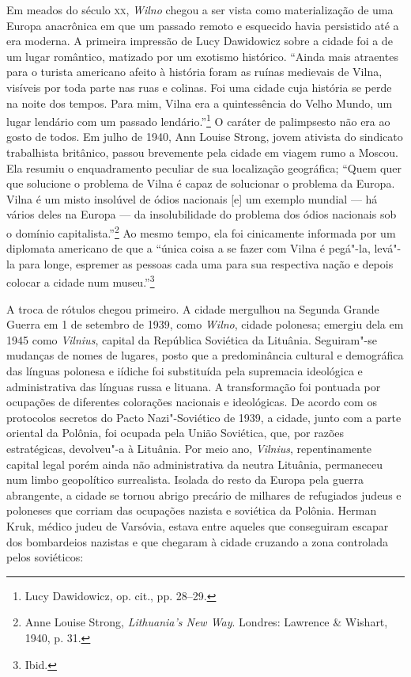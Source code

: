 %

Em meados do século \textsc{xx}, \textit{Wilno} chegou a ser vista como materialização de
uma Europa anacrônica em que um passado remoto e esquecido havia
persistido até a era moderna. A primeira impressão de Lucy Dawidowicz
sobre a cidade foi a de um lugar romântico, matizado por um exotismo
histórico. ``Ainda mais atraentes para o turista americano afeito à
história foram as ruínas medievais de Vilna, visíveis por toda parte nas
ruas e colinas. Foi uma cidade cuja história se perde na noite dos
tempos. Para mim, Vilna era a quintessência do Velho Mundo, um lugar
lendário com um passado lendário.''\footnote{Lucy Dawidowicz, op. cit., pp. 28--29.} O caráter de palimpsesto não era ao gosto de todos. Em julho de 1940, Ann Louise Strong, jovem ativista do sindicato
trabalhista britânico, passou brevemente pela cidade em viagem rumo a
Moscou. Ela resumiu o enquadramento peculiar de sua localização
geográfica; ``Quem quer que solucione o problema de Vilna é capaz de
solucionar o problema da Europa. Vilna é um misto insolúvel de ódios
nacionais {[}e{]} um exemplo mundial --- há vários deles na Europa --- da
insolubilidade do problema dos ódios nacionais sob o domínio
capitalista.''\footnote{Anne Louise Strong, \textit{Lithuania's New Way}. Londres: Lawrence \& Wishart, 1940, p. 31.} Ao mesmo tempo, ela foi cinicamente informada por um diplomata americano de que a ``única coisa
a se fazer com Vilna é pegá"-la, levá"-la para longe, espremer as pessoas
cada uma para sua respectiva nação e depois colocar a cidade num
museu.''\footnote{Ibid.}

A troca de rótulos chegou primeiro. A cidade mergulhou na Segunda Grande
Guerra em 1 de setembro de 1939, como \textit{Wilno}, cidade polonesa; emergiu
dela em 1945 como \textit{Vilnius}, capital da República Soviética da Lituânia.
Seguiram"-se mudanças de nomes de lugares, posto que a predominância
cultural e demográfica das línguas polonesa e iídiche foi substituída
pela supremacia ideológica e administrativa das línguas russa e lituana.
A transformação foi pontuada por ocupações de diferentes colorações
nacionais e ideológicas. De acordo com os protocolos secretos do Pacto
Nazi"-Soviético de 1939, a cidade, junto com a parte oriental da Polônia,
foi ocupada pela União Soviética, que, por razões estratégicas,
devolveu"-a à Lituânia. Por meio ano, \textit{Vilnius}, repentinamente capital
legal porém ainda não administrativa da neutra Lituânia, permaneceu num
limbo geopolítico surrealista. Isolada do resto da Europa pela guerra
abrangente, a cidade se tornou abrigo precário de milhares de refugiados
judeus e poloneses que corriam das ocupações nazista e soviética da
Polônia. Herman Kruk, médico judeu de Varsóvia, estava entre aqueles que
conseguiram escapar dos bombardeios nazistas e que chegaram à cidade
cruzando a zona controlada pelos soviéticos:

